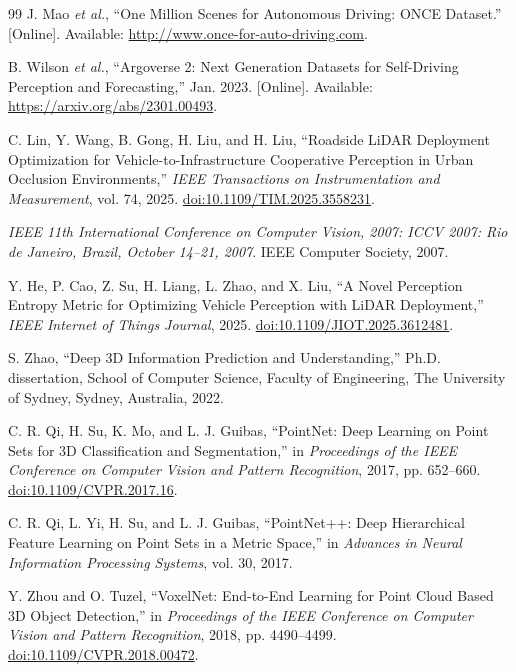 \begin{thebibliography}{99}
\label{bib_ref_19} J. Mao \emph{et al.}, ``One Million Scenes for Autonomous Driving: ONCE Dataset.'' [Online]. Available: \url{http://www.once-for-auto-driving.com}.

\label{bib_ref_20} B. Wilson \emph{et al.}, ``Argoverse 2: Next Generation Datasets for Self-Driving Perception and Forecasting,'' Jan. 2023. [Online]. Available: \url{https://arxiv.org/abs/2301.00493}.

\label{bib_ref_21} C. Lin, Y. Wang, B. Gong, H. Liu, and H. Liu, ``Roadside LiDAR Deployment Optimization for Vehicle-to-Infrastructure Cooperative Perception in Urban Occlusion Environments,'' \emph{IEEE Transactions on Instrumentation and Measurement}, vol. 74, 2025. \href{https://doi.org/10.1109/TIM.2025.3558231}{doi:10.1109/TIM.2025.3558231}.

\label{bib_ref_22} \emph{IEEE 11th International Conference on Computer Vision, 2007: ICCV 2007: Rio de Janeiro, Brazil, October 14--21, 2007}. IEEE Computer Society, 2007.

\label{bib_ref_23} Y. He, P. Cao, Z. Su, H. Liang, L. Zhao, and X. Liu, ``A Novel Perception Entropy Metric for Optimizing Vehicle Perception with LiDAR Deployment,'' \emph{IEEE Internet of Things Journal}, 2025. \href{https://doi.org/10.1109/JIOT.2025.3612481}{doi:10.1109/JIOT.2025.3612481}.


\label{bib_ref_24} S. Zhao, ``Deep 3D Information Prediction and Understanding,'' Ph.D. dissertation, School of Computer Science, Faculty of Engineering, The University of Sydney, Sydney, Australia, 2022.

\label{bib_ref_25} C. R. Qi, H. Su, K. Mo, and L. J. Guibas, ``PointNet: Deep Learning on Point Sets for 3D Classification and Segmentation,'' in \emph{Proceedings of the IEEE Conference on Computer Vision and Pattern Recognition}, 2017, pp. 652--660. \href{https://doi.org/10.1109/CVPR.2017.16}{doi:10.1109/CVPR.2017.16}.

\label{bib_ref_26} C. R. Qi, L. Yi, H. Su, and L. J. Guibas, ``PointNet++: Deep Hierarchical Feature Learning on Point Sets in a Metric Space,'' in \emph{Advances in Neural Information Processing Systems}, vol. 30, 2017.

\label{bib_ref_27} Y. Zhou and O. Tuzel, ``VoxelNet: End-to-End Learning for Point Cloud Based 3D Object Detection,'' in \emph{Proceedings of the IEEE Conference on Computer Vision and Pattern Recognition}, 2018, pp. 4490--4499. \href{https://doi.org/10.1109/CVPR.2018.00472}{doi:10.1109/CVPR.2018.00472}.



\end{thebibliography}
